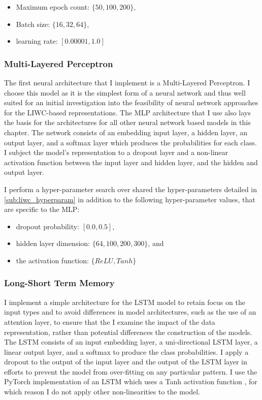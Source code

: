 \begin{itemize}
  \item Maximum epoch count: $\{50, 100, 200\}$,
  \item Batch size: $\{16, 32, 64\}$,
  \item learning rate: $[0.00001, 1.0]$
\end{itemize}

\subsubsection{Multi-Layered Perceptron}

The first neural architecture that I implement is a Multi-Layered Perceptron. I choose this model as it is the simplest form of a neural network and thus well suited for an initial investigation into the feasibility of neural network approaches for the LIWC-based representations. The MLP architecture that I use also lays the basis for the architectures for all other neural network based models in this chapter. The network consists of an embedding input layer, a hidden layer, an output layer, and a softmax layer which produces the probabilities for each class. I subject the model's representation to a dropout layer and a non-linear activation function between the input layer and hidden layer, and the hidden and output layer.

I perform a hyper-parameter search over shared the hyper-parameters detailed in \cref{sub:liwc_hyperparam} in addition to the following hyper-parameter values, that are specific to the MLP:

\begin{itemize}
  \item dropout probability: $[0.0, 0.5]$,
  \item hidden layer dimension: $\{64, 100, 200, 300\}$, and
  \item the activation function: $\{ReLU, Tanh\}$
\end{itemize}

\subsubsection{Long-Short Term Memory}
I implement a simple architecture for the LSTM model to retain focus on the input types and to avoid differences in model architectures, such as the use of an attention layer, to ensure that the I examine the impact of the data representation, rather than potential differences the construction of the models.
The LSTM consists of an input embedding layer, a uni-directional LSTM layer, a linear output layer, and a softmax to produce the class probabilities.
I apply a dropout to the output of the input layer and the output of the LSTM layer in efforts to prevent the model from over-fitting on any particular pattern. I use the PyTorch implementation of an LSTM which uses a Tanh activation function \citep{Paszke:2019}, for which reason I do not apply other non-linearities to the model.

